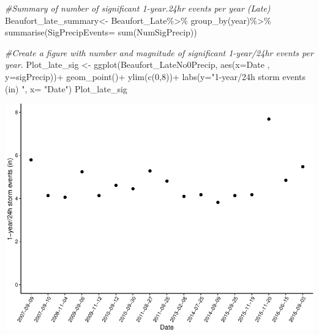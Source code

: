 \documentclass[
  12pt,
]{article}
\newenvironment{Shaded}{\begin{snugshade}}{\end{snugshade}}
\newcommand{\AttributeTok}[1]{\textcolor[rgb]{0.77,0.63,0.00}{#1}}
\newcommand{\CommentTok}[1]{\textcolor[rgb]{0.56,0.35,0.01}{\textit{#1}}}
\newcommand{\DecValTok}[1]{\textcolor[rgb]{0.00,0.00,0.81}{#1}}
\newcommand{\FunctionTok}[1]{\textcolor[rgb]{0.00,0.00,0.00}{#1}}
\newcommand{\NormalTok}[1]{#1}
\newcommand{\OtherTok}[1]{\textcolor[rgb]{0.56,0.35,0.01}{#1}}
\newcommand{\SpecialCharTok}[1]{\textcolor[rgb]{0.00,0.00,0.00}{#1}}
\newcommand{\StringTok}[1]{\textcolor[rgb]{0.31,0.60,0.02}{#1}}
\begin{document}
\begin{Shaded}
\begin{Highlighting}[]
\CommentTok{\#Summary of number of significant 1{-}year.24hr events per year (Late)}
\NormalTok{Beaufort\_late\_summary}\OtherTok{\textless{}{-}}\NormalTok{ Beaufort\_Late}\SpecialCharTok{\%\textgreater{}\%}
  \FunctionTok{group\_by}\NormalTok{(year)}\SpecialCharTok{\%\textgreater{}\%}
  \FunctionTok{summarise}\NormalTok{(}\AttributeTok{SigPrecipEvents=} \FunctionTok{sum}\NormalTok{(NumSigPrecip))}
\end{Highlighting}
\end{Shaded}

\newpage

\begin{Shaded}
\begin{Highlighting}[]
\CommentTok{\#Create a figure with number and magnitude of significant 1{-}year/24hr events per year.}
\NormalTok{Plot\_late\_sig }\OtherTok{\textless{}{-}} \FunctionTok{ggplot}\NormalTok{(Beaufort\_LateNo0Precip, }
                        \FunctionTok{aes}\NormalTok{(}\AttributeTok{x=}\NormalTok{Date , }\AttributeTok{y=}\NormalTok{sigPrecip))}\SpecialCharTok{+}
  \FunctionTok{geom\_point}\NormalTok{()}\SpecialCharTok{+}
  \FunctionTok{ylim}\NormalTok{(}\FunctionTok{c}\NormalTok{(}\DecValTok{0}\NormalTok{,}\DecValTok{8}\NormalTok{))}\SpecialCharTok{+}
  \FunctionTok{labs}\NormalTok{(}\AttributeTok{y=}\StringTok{"1{-}year/24h storm events (in) "}\NormalTok{, }\AttributeTok{x=} \StringTok{"Date"}\NormalTok{)}
\NormalTok{Plot\_late\_sig}
\end{Highlighting}
\end{Shaded}

\includegraphics{Final_Project_Thornton_Katayama_Ngenzi_files/figure-latex/late plot 1-1.pdf}
\newpage
\end{document}
